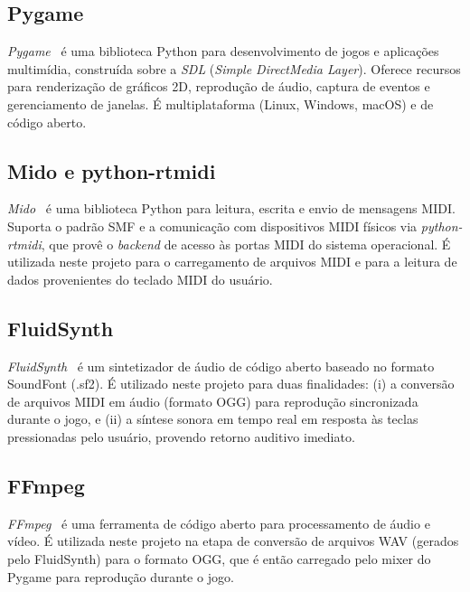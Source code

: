 \documentclass[
  12pt,
  openright,
  twoside,
  a4paper,
  english,
  brazil
]{abntex2}
\begin{document}
\subsection{Pygame}

\textit{Pygame}~\cite{pygame2000} é uma biblioteca Python para
desenvolvimento de jogos e aplicações multimídia, construída sobre a
\textit{SDL} (\textit{Simple DirectMedia Layer}). Oferece recursos para
renderização de gráficos 2D, reprodução de áudio, captura de eventos e
gerenciamento de janelas. É multiplataforma (Linux, Windows, macOS) e de
código aberto.

\subsection{Mido e python-rtmidi}

\textit{Mido}~\cite{mido2013} é uma biblioteca Python para leitura,
escrita e envio de mensagens MIDI. Suporta o padrão SMF e a comunicação
com dispositivos MIDI físicos via \textit{python-rtmidi}, que provê o
\textit{backend} de acesso às portas MIDI do sistema operacional. É
utilizada neste projeto para o carregamento de arquivos MIDI e para a
leitura de dados provenientes do teclado MIDI do usuário.

\subsection{FluidSynth}

\textit{FluidSynth}~\cite{fluidsynth2000} é um sintetizador de áudio de
código aberto baseado no formato SoundFont (.sf2). É utilizado neste
projeto para duas finalidades: (i) a conversão de arquivos MIDI em áudio
(formato OGG) para reprodução sincronizada durante o jogo, e (ii) a
síntese sonora em tempo real em resposta às teclas pressionadas pelo
usuário, provendo retorno auditivo imediato.

\subsection{FFmpeg}

\textit{FFmpeg}~\cite{ffmpeg} é uma ferramenta de código aberto para
processamento de áudio e vídeo. É utilizada neste projeto na etapa de
conversão de arquivos WAV (gerados pelo FluidSynth) para o formato OGG,
que é então carregado pelo mixer do Pygame para reprodução durante o jogo.

\end{document}
